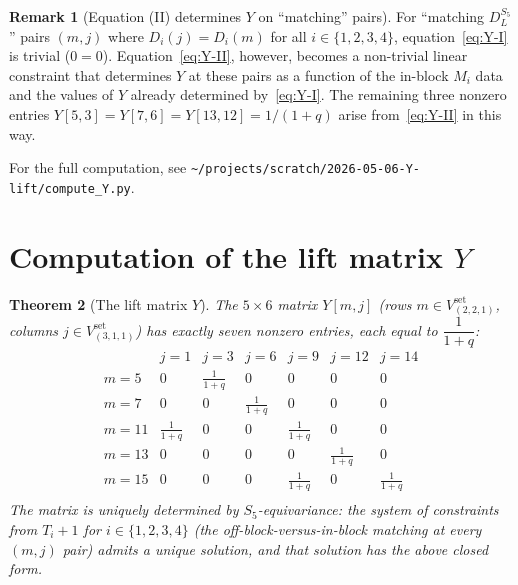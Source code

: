 \documentclass[11pt]{article}
\newtheorem{theorem}{Theorem}
\theoremstyle{definition}
\newtheorem{remark}[theorem]{Remark}
\begin{document}
\begin{remark}[Equation (II) determines $Y$ on ``matching'' pairs]\label{rem:eq-II}
For ``matching $D_L^{S_5}$'' pairs $(m, j)$ where $D_i(j) = D_i(m)$ for all $i \in \{1, 2, 3, 4\}$, equation~\eqref{eq:Y-I} is trivial ($0 = 0$). Equation~\eqref{eq:Y-II}, however, becomes a non-trivial linear constraint that determines $Y$ at these pairs as a function of the in-block $M_i$ data and the values of $Y$ already determined by~\eqref{eq:Y-I}. The remaining three nonzero entries $Y[5,3] = Y[7,6] = Y[13,12] = 1/(1+q)$ arise from~\eqref{eq:Y-II} in this way.
\end{remark}

For the full computation, see \texttt{\textasciitilde/projects/scratch/2026-05-06-Y-lift/compute\_Y.py}.

\section{Computation of the lift matrix $Y$}\label{sec:Y}

\begin{theorem}[The lift matrix $Y$]\label{thm:Y}
The $5 \times 6$ matrix $Y[m, j]$ (rows $m \in V_{(2,2,1)}^{\mathrm{set}}$, columns $j \in V_{(3,1,1)}^{\mathrm{set}}$) has exactly seven nonzero entries, each equal to $\dfrac{1}{1+q}$:
\[
\renewcommand{\arraystretch}{1.2}
\begin{array}{c|cccccc}
 & j=1 & j=3 & j=6 & j=9 & j=12 & j=14 \\\hline
m=5  & 0 & \frac{1}{1+q} & 0 & 0 & 0 & 0 \\
m=7  & 0 & 0 & \frac{1}{1+q} & 0 & 0 & 0 \\
m=11 & \frac{1}{1+q} & 0 & 0 & \frac{1}{1+q} & 0 & 0 \\
m=13 & 0 & 0 & 0 & 0 & \frac{1}{1+q} & 0 \\
m=15 & 0 & 0 & 0 & \frac{1}{1+q} & 0 & \frac{1}{1+q} \\
\end{array}
\]
The matrix is uniquely determined by $S_5$-equivariance: the system of constraints from $T_i + 1$ for $i \in \{1, 2, 3, 4\}$ (the off-block-versus-in-block matching at every $(m, j)$ pair) admits a unique solution, and that solution has the above closed form.
\end{theorem}
\end{document}

